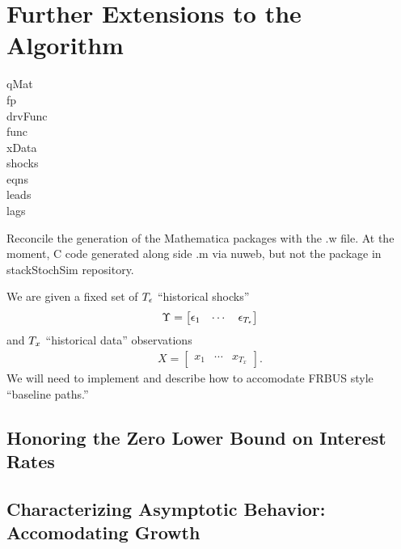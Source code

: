 \documentclass[12pt]{article}
\begin{document}
\section{Further Extensions to the Algorithm}
\label{sec:algorithm-overview}

\begin{description}
\item[qMat] 
\item[fp] 
\item[drvFunc] 
\item[func] 
\item[xData] 
\item[shocks] 
\item[eqns] 
\item[leads] 
\item[lags] 
\end{description}



Reconcile the generation of the Mathematica packages with the .w file. At the moment, C code generated along side .m via nuweb, but not the package in stackStochSim repository.

We are given a fixed set of ${T_\epsilon}$ ``historical shocks''
\begin{gather*}
  \Upsilon =
  \begin{bmatrix}
    \epsilon_1&\cdots&\epsilon_{{T_\epsilon}}
  \end{bmatrix}
\end{gather*}
and ${T_x}$ ``historical data'' observations
\begin{gather*}
  X =
  \begin{bmatrix}
    x_1&\cdots&x_{T_x}
  \end{bmatrix}.
\end{gather*}
We will need to implement and describe how to accomodate FRBUS style ``baseline paths.''

\subsection{Honoring the Zero Lower Bound on Interest Rates}
\label{sec:honoring-zero-lower}

\subsection{Characterizing Asymptotic Behavior:  Accomodating Growth}
\label{sec:char-asympt-behav}
\end{document}
